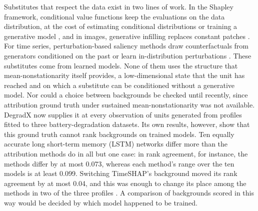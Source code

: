 \documentclass{article}
\begin{document}
Substitutes that respect the data exist in two lines of work. In the Shapley framework, conditional value functions keep the evaluations on the data distribution, at the cost of estimating conditional distributions or training a generative model \citep{frye2021shapley, aas2021explaining}, and in images, generative infilling replaces constant patches \citep{chang2019explaining, jain2022missingness}. For time series, perturbation-based saliency methods draw counterfactuals from generators conditioned on the past or learn in-distribution perturbations \citep{tonekaboni2020went, liu2024explaining}. These substitutes come from learned models. None of them uses the structure that mean-nonstationarity itself provides, a low-dimensional state that the unit has reached and on which a substitute can be conditioned without a generative model. Nor could a choice between backgrounds be checked until recently, since attribution ground truth under sustained mean-nonstationarity was not available. DegradX \citep{degradx2026} now supplies it at every observation of units generated from profiles fitted to three battery-degradation datasets. Its own results, however, show that this ground truth cannot rank backgrounds on trained models. Ten equally accurate long short-term memory (LSTM) networks \citep{hochreiter1997long} differ more than the attribution methods do in all but one case: in rank agreement, for instance, the methods differ by at most 0.073, whereas each method's range over the ten models is at least 0.099. Switching TimeSHAP's background moved its rank agreement by at most 0.04, and this was enough to change its place among the methods in two of the three profiles \citep{degradx2026}. A comparison of backgrounds scored in this way would be decided by which model happened to be trained.
\end{document}
